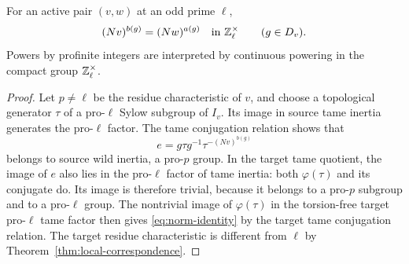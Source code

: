 \begin{lemma}\label{lem:norm-identity}
For an active pair $(v,w)$ at an odd prime $\ell$,
\begin{equation}\label{eq:norm-identity}
 (Nv)^{b(g)}=(Nw)^{a(g)}\quad\text{in }\mathbb Z_\ell^\times
 \qquad(g\in D_v).
\end{equation}
Powers by profinite integers are interpreted by continuous powering in the compact group $\mathbb Z_\ell^\times$.
\end{lemma}
\begin{proof}
Let $p\ne\ell$ be the residue characteristic of $v$, and choose a topological generator $\tau$ of a pro-$\ell$ Sylow subgroup of $I_v$. Its image in source tame inertia generates the pro-$\ell$ factor. The tame conjugation relation shows that
\[
 e=g\tau g^{-1}\tau^{-(Nv)^{b(g)}}
\]
belongs to source wild inertia, a pro-$p$ group. In the target tame quotient, the image of $e$ also lies in the pro-$\ell$ factor of tame inertia: both $\varphi(\tau)$ and its conjugate do. Its image is therefore trivial, because it belongs to a pro-$p$ subgroup and to a pro-$\ell$ group. The nontrivial image of $\varphi(\tau)$ in the torsion-free target pro-$\ell$ tame factor then gives \eqref{eq:norm-identity} by the target tame conjugation relation. The target residue characteristic is different from $\ell$ by Theorem~\ref{thm:local-correspondence}.
\end{proof}
